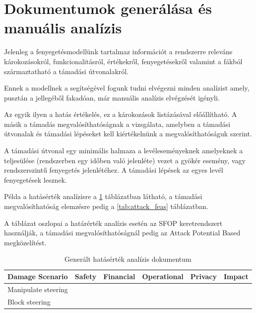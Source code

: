 \section{Dokumentumok generálása és manuális analízis}

Jelenleg a fenyegetésmodellünk tartalmaz információt a rendszerre releváns károkozásokról, funkcionalitásról, értékekről, fenyegetésekről valamint a fákból származtatható a támadási útvonalakról.

Ennek a modellnek a segítségével fogunk tudni elvégezni minden analízist amely, pusztán a jellegéből fakadóan, már manuális analízis elvégzését igényli.

Az egyik ilyen a hatás értékelés, ez a károkozások listázásával előállítható. A másik a támadás megvalósíthatóságnak a vizsgálata, amelyben a támadási útvonalak és támadási lépéseket kell kiértékelnünk a megvalósíthatóságuk szerint.

A támadási útvonal egy minimális halmaza a levéleseményeknek amelyeknek a teljesülése (rendszerben egy időben való jelenléte) vezet a gyökér esemény, vagy rendszerszintű fenyegetés jelenlétéhez. A támadási lépések az egyes levél fenyegetések lesznek.

Példa a hatásérték analízisre a \ref{tab:impact_rating} táblázatban látható, a támadási megvalósíthatóság elemzésre pedig a \ref{tab:attack_feas} táblázatban.

A táblázat oszlopai a határérték analízis esetén az SFOP keretrendszert használják, a támadási megvalósíthatóságnál pedig az Attack Potential Based megközelítést.

\begin{table}[h]
	\centering
	\begin{tabular}{|l|l|l|l|l|l|}
		\hline
		Damage Scenario & Safety & Financial & Operational & Privacy & Impact \\ \hline
		Manipulate steering & ~ & ~ & ~ & ~ & ~ \\ \hline
		Block steering & ~ & ~ & ~ & ~ & ~ \\ \hline
	\end{tabular}
	\caption{Generált hatásérték analízis dokumentum}
	\label{tab:impact_rating}
\end{table}

